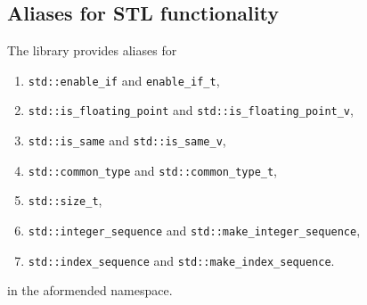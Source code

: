 \documentclass[oneside]{book}
\begin{document}
\subsection{Aliases for STL functionality}
The library provides aliases for
\begin{enumerate}
	\item \texttt{std::enable\_if} and \texttt{enable\_if\_t},
	\item \texttt{std::is\_floating\_point} and \texttt{std::is\_floating\_point\_v},
	\item \texttt{std::is\_same} and \texttt{std::is\_same\_v},
	\item \texttt{std::common\_type} and \texttt{std::common\_type\_t},
	\item \texttt{std::size\_t},
	\item \texttt{std::integer\_sequence} and \texttt{std::make\_integer\_sequence},
	\item \texttt{std::index\_sequence} and \texttt{std::make\_index\_sequence}.
\end{enumerate}
in the aformended namespace.
\end{document}
